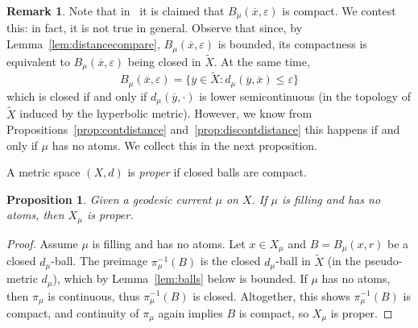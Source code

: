 \documentclass[12pt,article]{amsart}
\numberwithin{equation}{section}
\numberwithin{figure}{section}
\newtheorem{proposition}[equation]{Proposition}
\theoremstyle{definition}
\newtheorem{remark}[equation]{Remark}
\theoremstyle{plain}
\newcommand*{\wt}[1]{\widetilde{#1}}
\renewcommand{\epsilon}{\varepsilon}
\begin{document}
\begin{remark}
Note that in~\cite[Proposition~2.8]{Glo17:CriticalExponents} it is claimed that $B_{\mu}(\overline{x},\epsilon)$ is compact. We contest this: in fact, it is not true in general. Observe that since, by Lemma~\ref{lem:distancecompare}, $B_{\mu}(\overline{x},\epsilon)$ is bounded, its compactness is equivalent to $B_{\mu}(\overline{x},\epsilon)$ being closed in $\wt{X}$. At the same time, 
\[
B_{\mu}(\overline{x},\epsilon) = \{ \overline{y} \in \wt{X} \colon d_{\mu}(\overline{y},\overline{x}) \leq \epsilon \}
\]
which is closed if and only if $d_{\mu}(\overline{y},\cdot)$ is lower semicontinuous (in the topology of $\wt{X}$ induced by the hyperbolic metric). However, we know from Propositions~\ref{prop:contdistance} and~\ref{prop:discontdistance} this happens if and only if $\mu$ has no atoms.
We collect this in the next proposition.
\end{remark}

A metric space $(X, d)$ is \emph{proper} if closed balls are compact.

\begin{proposition}
Given a geodesic current $\mu$ on $X$.
If $\mu$ is filling and has no atoms, then $X_{\mu}$ is proper.
\label{prop:properspace}
\end{proposition}
\begin{proof}
Assume $\mu$ is filling and has no atoms.
Let $x \in X_{\mu}$ and $B=B_{\mu}(x,r)$ be a closed $d_{\mu}$-ball. The preimage $\pi_{\mu}^{-1}(B)$ is the closed $d_{\mu}$-ball in $\wt{X}$ (in the pseudo-metric $d_{\mu}$), which by Lemma~\ref{lem:balls} below is bounded.
If $\mu$ has no atoms, then $\pi_{\mu}$ is continuous, thus $\pi_{\mu}^{-1}(B)$ is closed. Altogether, this shows $\pi_{\mu}^{-1}(B)$ is compact, and continuity of $\pi_{\mu}$ again implies $B$ is compact, so $X_{\mu}$ is proper.
\end{proof}
\end{document}

